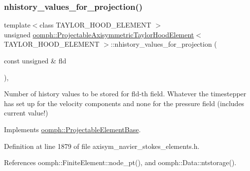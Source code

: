\mbox{\label{classoomph_1_1ProjectableAxisymmetricTaylorHoodElement_af37df6381430a8983892ff3a1b425266}} 
\subsubsection{\texorpdfstring{nhistory\+\_\+values\+\_\+for\+\_\+projection()}{nhistory\_values\_for\_projection()}}
{\footnotesize\ttfamily template$<$class T\+A\+Y\+L\+O\+R\+\_\+\+H\+O\+O\+D\+\_\+\+E\+L\+E\+M\+E\+NT $>$ \\
unsigned \hyperlink{classoomph_1_1ProjectableAxisymmetricTaylorHoodElement}{oomph\+::\+Projectable\+Axisymmetric\+Taylor\+Hood\+Element}$<$ T\+A\+Y\+L\+O\+R\+\_\+\+H\+O\+O\+D\+\_\+\+E\+L\+E\+M\+E\+NT $>$\+::nhistory\+\_\+values\+\_\+for\+\_\+projection (\begin{DoxyParamCaption}\item[{const unsigned \&}]{fld }\end{DoxyParamCaption})\hspace{0.3cm}{\ttfamily [inline]}, {\ttfamily [virtual]}}



Number of history values to be stored for fld-\/th field. Whatever the timestepper has set up for the velocity components and none for the pressure field (includes current value!) 



Implements \hyperlink{classoomph_1_1ProjectableElementBase_ac6790f394630b964663281f8740f43a5}{oomph\+::\+Projectable\+Element\+Base}.



Definition at line 1879 of file axisym\+\_\+navier\+\_\+stokes\+\_\+elements.\+h.



References oomph\+::\+Finite\+Element\+::node\+\_\+pt(), and oomph\+::\+Data\+::ntstorage().

\mbox{\label{classoomph_1_1ProjectableAxisymmetricTaylorHoodElement_a47410e0fbb3ad00b2a71f8fb7f789070}} 
